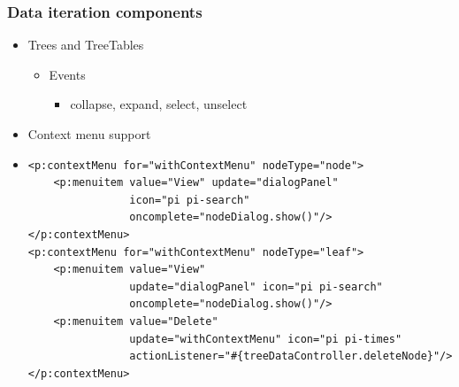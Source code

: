 \documentclass[10pt,xcolor=pdflatex]{beamer}
\begin{document}
\begin{frame}[containsverbatim]\frametitle{Data iteration components}
  \begin{itemize}
    \item Trees and TreeTables
	  \begin{itemize}
		\item Events
          \begin{itemize}
            \item collapse, expand, select, unselect
          \end{itemize}
	  \end{itemize}
    
    \item Context menu support
    \vspace*{0.1cm}
    \item[] \begin{footnotesize} \begin{verbatim}
<p:contextMenu for="withContextMenu" nodeType="node">
    <p:menuitem value="View" update="dialogPanel" 
                icon="pi pi-search"
                oncomplete="nodeDialog.show()"/>
</p:contextMenu>
<p:contextMenu for="withContextMenu" nodeType="leaf">
    <p:menuitem value="View" 
                update="dialogPanel" icon="pi pi-search" 	
                oncomplete="nodeDialog.show()"/>
    <p:menuitem value="Delete" 
                update="withContextMenu" icon="pi pi-times"
                actionListener="#{treeDataController.deleteNode}"/>
</p:contextMenu>
\end{verbatim} \end{footnotesize}
  \end{itemize}
\end{frame}
\end{document}

